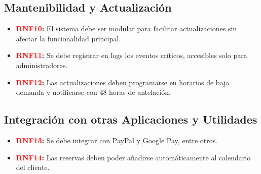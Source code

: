 \subsection*{Mantenibilidad y Actualización}
\begin{itemize}
    \item \textbf{\textcolor{red}{RNF10}:} El sistema debe ser modular para facilitar actualizaciones sin afectar la funcionalidad principal.
    \item \textbf{\textcolor{red}{RNF11}:} Se debe registrar en logs los eventos críticos, accesibles solo para administradores.
    \item \textbf{\textcolor{red}{RNF12}:} Las actualizaciones deben programarse en horarios de baja demanda y notificarse con 48 horas de antelación.
\end{itemize}

\subsection*{Integración con otras Aplicaciones y Utilidades}
\begin{itemize}
    \item \textbf{\textcolor{red}{RNF13}:} Se debe integrar con PayPal y Google Pay, entre otros.
    \item \textbf{\textcolor{red}{RNF14}:} Las reservas deben poder añadirse automáticamente al calendario del cliente.
\end{itemize}